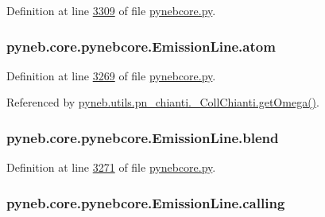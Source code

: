 Definition at line \hyperlink{pynebcore_8py_source_l03309}{3309} of file \hyperlink{pynebcore_8py_source}{pynebcore.\+py}.

\hypertarget{classpyneb_1_1core_1_1pynebcore_1_1_emission_line_a4792ac5b02cda998caaf42203e4541e9}{}
\subsubsection[{atom}]{\setlength{\rightskip}{0pt plus 5cm}pyneb.\+core.\+pynebcore.\+Emission\+Line.\+atom}\label{classpyneb_1_1core_1_1pynebcore_1_1_emission_line_a4792ac5b02cda998caaf42203e4541e9}


Definition at line \hyperlink{pynebcore_8py_source_l03269}{3269} of file \hyperlink{pynebcore_8py_source}{pynebcore.\+py}.



Referenced by \hyperlink{pn__chianti_8py_source_l00484}{pyneb.\+utils.\+pn\+\_\+chianti.\+\_\+\+Coll\+Chianti.\+get\+Omega()}.

\hypertarget{classpyneb_1_1core_1_1pynebcore_1_1_emission_line_a44f73379aadc3e6231d66dd7a6ebae6b}{}
\subsubsection[{blend}]{\setlength{\rightskip}{0pt plus 5cm}pyneb.\+core.\+pynebcore.\+Emission\+Line.\+blend}\label{classpyneb_1_1core_1_1pynebcore_1_1_emission_line_a44f73379aadc3e6231d66dd7a6ebae6b}


Definition at line \hyperlink{pynebcore_8py_source_l03271}{3271} of file \hyperlink{pynebcore_8py_source}{pynebcore.\+py}.

\hypertarget{classpyneb_1_1core_1_1pynebcore_1_1_emission_line_ac14a01c0f8aac44c5e2381cadfacf2cf}{}
\subsubsection[{calling}]{\setlength{\rightskip}{0pt plus 5cm}pyneb.\+core.\+pynebcore.\+Emission\+Line.\+calling}\label{classpyneb_1_1core_1_1pynebcore_1_1_emission_line_ac14a01c0f8aac44c5e2381cadfacf2cf}



